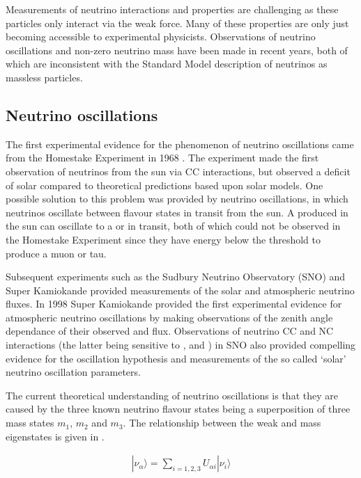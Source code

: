Measurements of neutrino interactions and properties are challenging as these particles only interact via the weak force. Many of these properties are only just becoming accessible to experimental physicists. Observations of neutrino oscillations and non-zero neutrino mass have been made in recent years, both of which are inconsistent with the Standard Model description of neutrinos as massless particles.


\subsection{Neutrino oscillations}
\label{section:particle-physics:neutrino:oscillations}

The first experimental evidence for the phenomenon of neutrino oscillations came from the Homestake Experiment in 1968 \cite{0004-637X-496-1-505}. The experiment made the first observation of neutrinos from the sun via CC interactions, but observed a deficit of solar \Pnue compared to theoretical predictions based upon solar models. One possible solution to this problem was provided by neutrino oscillations, in which neutrinos oscillate between flavour states in transit from the sun. A \Pnue produced in the sun can oscillate to a \Pnum or \Pnut in transit, both of which could not be observed in the Homestake Experiment since they have energy below the threshold to produce a muon or tau.

Subsequent experiments such as the Sudbury Neutrino Observatory (SNO) \cite{Ahmad:2002jz} and Super Kamiokande  \cite{PhysRevLett.81.1562} provided measurements of the solar and atmospheric neutrino fluxes. In 1998 Super Kamiokande provided the first experimental evidence for atmospheric neutrino oscillations by making observations of the zenith angle dependance of their observed \Pnum and \Pnue flux. Observations of neutrino CC and NC interactions (the latter being sensitive to \Pnue, \Pnum and \Pnut) in SNO also provided compelling evidence for the oscillation hypothesis and measurements of the so called `solar' neutrino oscillation parameters.

The current theoretical understanding of neutrino oscillations is that they are caused by the three known neutrino flavour states being a superposition of three mass states \textit{$m_{1}$}, \textit{$m_{2}$} and \textit{$m_{3}$}. The relationship between the weak and mass eigenstates is given in .

\begin{gather}
  |\nu_{\alpha}\rangle = \sum\limits_{i=1,2,3}U_{\alpha i}|\nu_{i}\rangle
  \label{eq:particle-physics:neutrino-flavour-mass-relation}
\end{gather}


